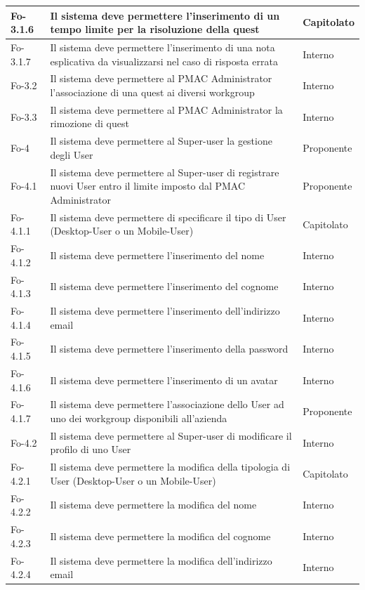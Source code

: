 {{\begin{longtable}{|p{}|p{}|p{}|}
\hline
Fo-3.1.6 & Il sistema deve permettere l'inserimento di un tempo limite per la risoluzione della quest & Capitolato\\
\hline
Fo-3.1.7 & Il sistema deve permettere l'inserimento di una nota esplicativa da visualizzarsi nel caso di risposta errata & Interno\\
\hline
Fo-3.2 & Il sistema deve permettere al PMAC Administrator l'associazione di una quest ai diversi workgroup & Interno\\
\hline
Fo-3.3 & Il sistema deve permettere al PMAC Administrator la rimozione di quest & Interno\\
\hline
Fo-4 & Il sistema deve permettere al Super-user la gestione degli User & Proponente\\
\hline
Fo-4.1 & Il sistema deve permettere al Super-user di registrare nuovi User entro il limite imposto dal PMAC Administrator & Proponente\\
\hline
Fo-4.1.1 & Il sistema deve permettere di specificare il tipo di User (Desktop-User o un Mobile-User) & Capitolato\\
\hline
Fo-4.1.2 & Il sistema deve permettere l'inserimento del nome & Interno\\
\hline
Fo-4.1.3 & Il sistema deve permettere l'inserimento del cognome & Interno\\
\hline
Fo-4.1.4 & Il sistema deve permettere l'inserimento dell'indirizzo email & Interno\\
\hline
Fo-4.1.5 & Il sistema deve permettere l'inserimento della password & Interno\\
\hline
Fo-4.1.6 & Il sistema deve permettere l'inserimento di un avatar & Interno\\
\hline
Fo-4.1.7 & Il sistema deve permettere l'associazione dello User ad uno dei workgroup disponibili all'azienda & Proponente\\
\hline
Fo-4.2 & Il sistema deve permettere al Super-user di modificare il profilo di uno User & Interno\\
\hline
Fo-4.2.1 & Il sistema deve permettere la modifica della tipologia di User (Desktop-User o un Mobile-User) & Capitolato\\
\hline
Fo-4.2.2 & Il sistema deve permettere la modifica del nome & Interno\\
\hline
Fo-4.2.3 & Il sistema deve permettere la modifica del cognome & Interno\\
\hline
Fo-4.2.4 & Il sistema deve permettere la modifica dell'indirizzo email & Interno\\

\end{longtable}}}
